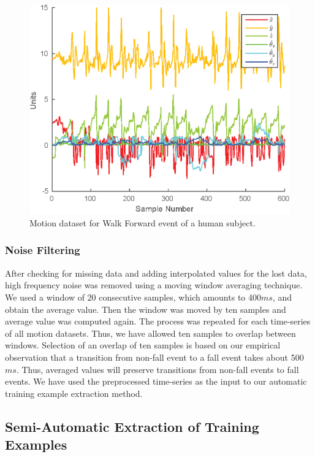 \documentclass[]{IEEEtran}
\begin{document}
\begin{figure}[htb]
	\centering
		\includegraphics[width=0.95\columnwidth]{plots/human_walk-crop.eps}
	\caption{Motion dataset for Walk Forward event of a human subject. }
	\label{fig:human_walk_forward-crop}
\end{figure}


\subsubsection{Noise Filtering}
\label{sec:NoiseFiltering}

After checking for missing data and adding interpolated values for the lost data,  high frequency noise was removed using a moving window averaging technique. We used a window  of 20 consecutive samples, which amounts to 400$ms$, 
and obtain the average value. Then the  window was moved by ten samples and average  value was computed again. The
process was repeated for each time-series of all motion datasets. Thus, we have allowed ten samples to overlap between windows. 
Selection of an overlap of ten samples is based on our empirical observation that a transition from non-fall event to a fall event takes about 500$ms$. Thus, averaged values will preserve transitions from non-fall events to fall events.   We have used the preprocessed time-series as the input to our automatic training example 
extraction method.


\subsection{Semi-Automatic  Extraction of Training Examples}
\end{document}
